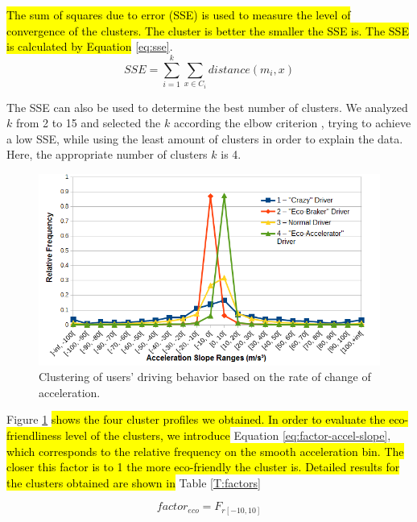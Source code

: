 \documentclass[preprint,authoryear,12pt]{elsarticle}
\newcommand{\hlc}[2][yellow]{ {\sethlcolor{#1} \hl{#2}} }
\begin{document}
\hlc[green]{
The sum of squares due to error (SSE) is used to measure the level of convergence of the clusters. The cluster is better the smaller the SSE is. The SSE is calculated by Equation
}
 \ref{eq:sse}.
\begin{equation}\label{eq:sse}
SSE = \sum\limits_{i=1}^{k} \sum\limits_{x \in C_{i}}distance(m_{i},x)
\end{equation}

The SSE can also be used to determine the best number of clusters. We analyzed $k$ from 2 to 15 and selected the $k$ according the elbow criterion \cite{Thorndike.1953}, trying to achieve a low SSE, while using the least amount of clusters in order to explain the data. Here, the appropriate number of clusters $k$ is 4. 

\begin{figure}[htb]
	\begin{center}
		\includegraphics[width=1\linewidth]{ijhcs14-img/kmeansclustering}
		\caption{Clustering of users' driving behavior based on the rate of change of acceleration.\label{fig:accel-ranges}}
	\end{center}
\end{figure}


Figure \ref{fig:accel-ranges} 
\hlc[green]{
	shows the four cluster profiles we obtained. In order to evaluate the eco-friendliness level of the clusters, we introduce
} Equation \ref{eq:factor-accel-slope}, 
\hlc[green]{which corresponds to the relative frequency on the smooth acceleration bin. The closer this factor is to 1 the more eco-friendly the cluster is.
Detailed results for the clusters obtained are shown in
} Table \ref{T:factors}

\begin{equation}\label{eq:factor-accel-slope}
factor_{eco} = F_{r[-10,10]}
\end{equation}
\end{document}

